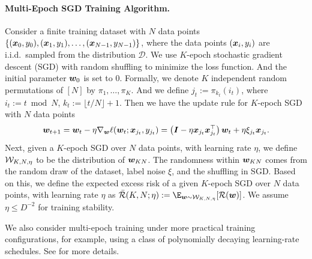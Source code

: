 \paragraph{Multi-Epoch SGD Training Algorithm.} Consider a finite training dataset with $N$ data points $\{({\bm{x}}_0,y_0),({\bm{x}}_1,y_1),\dots,({\bm{x}}_{N-1},y_{N-1})\}$, where the data points $({\bm{x}}_i, y_i)$ are i.i.d.~sampled from the distribution $\mathcal{D}$. We use $K$-epoch stochastic gradient descent (SGD) with random shuffling to minimize the loss function. And the initial parameter ${\bm{w}}_0$ is set to $0$. Formally, we denote $K$ independent random permutations of $[N]$ by $\pi_1, \dots, \pi_K$. And we define $j_t := \pi_{k_t}(i_t)$, where $i_t := t \bmod N$, $k_t := \lfloor t / N \rfloor + 1$. Then we have the update rule for $K$-epoch SGD with $N$ data points
\begin{equation}
    {\bm{w}}_{t+1} = {\bm{w}}_{t} - \eta \nabla_{{\bm{w}}}\ell({\bm{w}}_t; {\bm{x}}_{j_t}, y_{j_t}) =\left({\bm{I}}-\eta{\bm{x}}_{j_t}{\bm{x}}_{j_t}^{\top}\right){\bm{w}}_t+\eta\xi_{j_t}{\bm{x}}_{j_t}. \nonumber
\end{equation}
Next, given a $K$-epoch SGD over $N$ data points, with learning rate $\eta$, we define $\mathcal{W}_{K,N,\eta}$ to be the distribution of ${\bm{w}}_{KN}$. The randomness within ${\bm{w}}_{KN}$ comes from the random draw of the dataset, label noise $\xi$, and the shuffling in SGD. Based on this, we define the expected excess risk of a given $K$-epoch SGD over $N$ data points, with learning rate $\eta$ as $\bar{\cR}(K, N; \eta) := \E_{\vw \sim \cW_{K,N,\eta}}[\cR(\vw)]$. We assume $\eta \leq D^{-2}$ for training stability.

We also consider multi-epoch training under more practical training configurations, for example, using a class of polynomially decaying learning-rate schedules. See  for more details.

